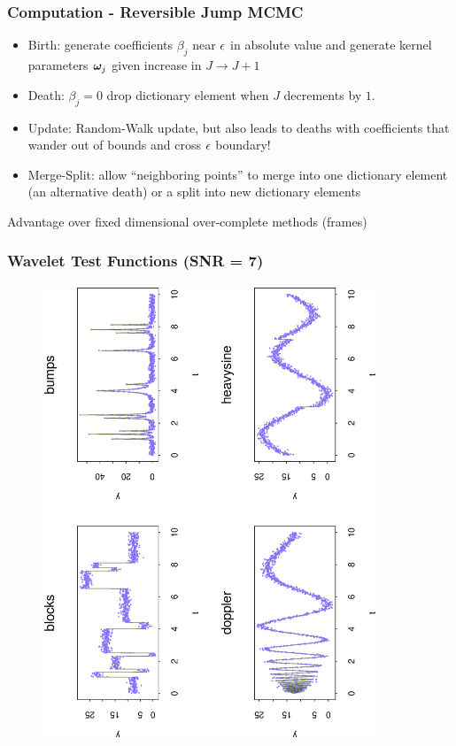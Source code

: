 \documentclass[handout]{beamer}
\newcommand{\bs}[2]{\begin{frame} \frametitle{#1}
{#2}
\end{frame} }
\begin{document}
\bs{Computation - Reversible Jump MCMC} {

  \begin{itemize}
  \item Birth: generate coefficients $\beta_j$ near $\epsilon$ in absolute value
    and generate kernel parameters $\bm \omega_j$ given increase in $J
    \to J+1$ \pause
\item Death: $\beta_j = 0$  drop dictionary element when $J$
  decrements by $1$.  \pause
\item Update:  Random-Walk update, but also leads to deaths with
  coefficients that wander out of bounds and cross $\epsilon$
  boundary! \pause
\item Merge-Split: allow ``neighboring points'' to merge into one
  dictionary element (an alternative death) or a split into  new
  dictionary elements \pause
  \end{itemize}
Advantage over fixed dimensional over-complete methods (frames)

}


\bs{Wavelet Test Functions (SNR = 7)} {
\begin{figure}[!h]
  \begin{center}
    \includegraphics[angle=270,origin=l,totalheight=6truecm,
     clip=1,width=10cm]{wavedata.ps}
  \end{center}
\end{figure}
}
\end{document}
